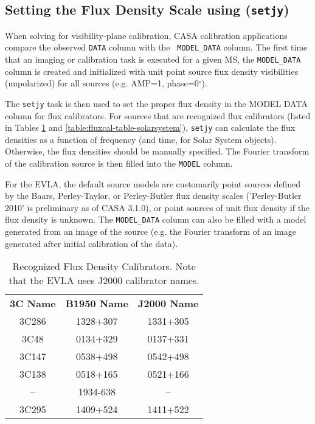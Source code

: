 \subsection{Setting the Flux Density Scale using ({\tt setjy})}
\label{section:cal.prior.models}

When solving for visibility-plane calibration, CASA calibration
applications compare the observed {\tt DATA} column with the {\tt
  MODEL\_DATA} column.  The first time that an imaging or calibration
task is executed for a given MS, the {\tt MODEL\_DATA} column is
created and initialized with unit point source flux density
visibilities (unpolarized) for all sources (e.g. AMP=1,
phase=0$^{\circ}$).  

The {\tt setjy} task is then used to set the proper flux density in
the MODEL DATA column for flux calibrators. For sources that are
recognized flux calibrators (listed in Tables
\ref{table:fluxcal-table} and \ref{table:fluxcal-table-solarsystem}),
{\tt setjy} can calculate the flux densities as a function of
frequency (and time, for Solar System objects).  Otherwise, the flux
densities should be manually specified.  The Fourier transform of the
calibration source is then filled into the {\tt MODEL} column.

For the EVLA, the default source models are customarily point sources
defined by the Baars, Perley-Taylor, or Perley-Butler flux density
scales ('Perley-Butler 2010' is preliminary as of CASA 3.1.0),
or point sources of unit flux density if the flux density is
unknown. The {\tt MODEL\_DATA} column can also be filled with a model
generated from an image of the source (e.g. the Fourier transform of
an image generated after initial calibration of the data).

\vspace{5mm}
\begin{table}[h!]
\caption{Recognized Flux Density Calibrators. Note that the EVLA uses
J2000 calibrator names.
        {\label{table:fluxcal-table}}}
\begin{center}
\begin{tabular}{|ccc|} \hline
{\bf 3C Name}  & {\bf B1950 Name}& {\bf J2000 Name} \\
  3C286        &  1328+307       &  1331+305        \\
  3C48         &  0134+329       &  0137+331        \\
  3C147        &  0538+498       &  0542+498        \\
  3C138        &  0518+165       &  0521+166        \\
  --           &  1934-638       &    --            \\
  3C295        &  1409+524       &  1411+522        \\
\hline
\end{tabular}
\end{center}
\end{table}

